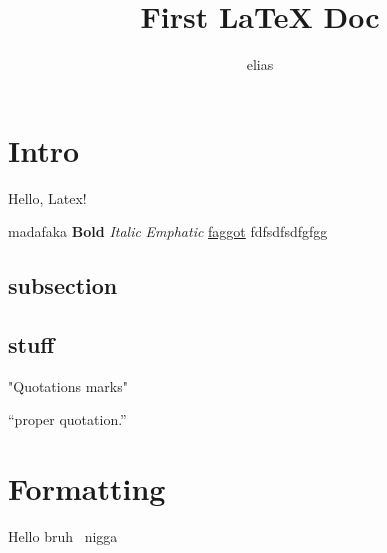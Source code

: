 \documentclass{article}
\author{elias}
\title{First {\LaTeX} Doc}
\begin{document}
\maketitle
\section{Intro}
Hello, Latex!

madafaka \textbf{Bold}
\textit{Italic}
\emph{Emphatic}
\underline{faggot}
fdfsdfsdfgfgg
\subsection{subsection}

\subsection{stuff}
"Quotations marks"

``proper quotation.''


\section{Formatting}
Hello bruh \ nigga
\end{document}
